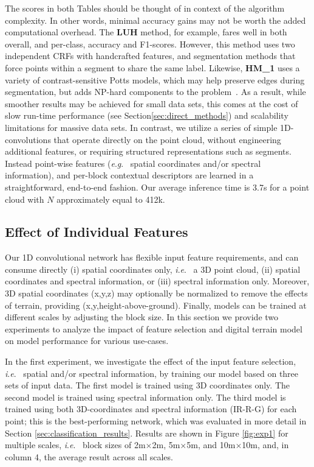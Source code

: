 \documentclass[final,3p,times,twocolumn,authoryear]{elsarticle}
\newcommand{\ie}{\textit{i}.\textit{e}.}
\newcommand{\eg}{\textit{e}.\textit{g}.}
\begin{document}
The scores in both Tables should be thought of in context of the algorithm complexity. 
In other words, minimal accuracy gains may not be worth the added computational overhead. 
The {\bf LUH} method, for example, fares well in both overall, and per-class, accuracy and F1-scores. 
However, this method uses two independent CRFs with handcrafted features, and segmentation methods that force points within a segment to share the same label. Likewise, {\bf HM\_1} uses a variety of contrast-sensitive Potts models, which may help preserve edges during segmentation, but adds NP-hard components to the problem~\citep{potts_model_2001}. As a result, while smoother results may be achieved for small data sets, this comes at the cost of slow run-time performance (see Section\ref{sec:direct_methods}) and scalability limitations for massive data sets. 
In contrast, we utilize a series of simple 1D-convolutions that operate directly on the point cloud, without engineering additional features, or requiring structured representations such as segments. 
Instead point-wise features (\eg~ spatial coordinates and/or spectral information), and per-block contextual descriptors are learned in a straightforward, end-to-end fashion. Our average inference time is 3.7s for a point cloud with $N$ approximately equal to 412k. %





\subsection{Effect of Individual Features}
\label{sec:effect_of_individual_features}
Our 1D convolutional network has flexible input feature requirements, and can consume directly (i) spatial coordinates only, \ie~ a 3D point cloud, (ii) spatial coordinates and spectral information, or (iii) spectral information only. %
Moreover, 3D spatial coordinates (x,y,z) may optionally be normalized to remove the effects of terrain, providing (x,y,height-above-ground). 
Finally, models can be trained at different scales by adjusting the block size. 
In this section we provide two experiments to analyze the impact of feature selection and digital terrain model on model performance for various use-cases. 

In the first experiment, we investigate the effect of the input feature selection, \ie~ spatial and/or spectral information, by training our model based on three sets of input data.  
The first model is trained using 3D coordinates only. 
The second model is trained using spectral information only.
The third model is trained using both 3D-coordinates and spectral information (IR-R-G) for each point; this is the best-performing network, which was evaluated in more detail in Section \ref{sec:classification_results}.
Results are shown in Figure \ref{fig:exp1} for multiple scales, \ie~  block sizes of 2m$\times$2m, 5m$\times$5m, and 10m$\times$10m, and,  in column 4, the average result across all scales.
\end{document}
